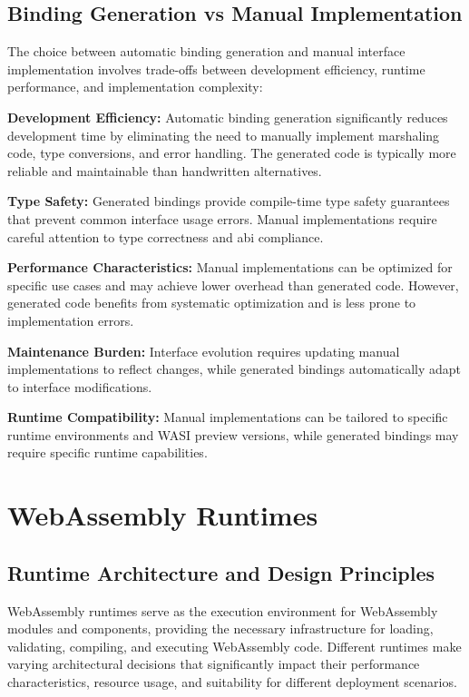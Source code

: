 \subsection{Binding Generation vs Manual Implementation}
\label{subsec:binding-comparison}

The choice between automatic binding generation and manual interface implementation involves trade-offs between development efficiency, runtime performance, and implementation complexity:

\textbf{Development Efficiency:} Automatic binding generation significantly reduces development time by eliminating the need to manually implement marshaling code, type conversions, and error handling. The generated code is typically more reliable and maintainable than handwritten alternatives.

\textbf{Type Safety:} Generated bindings provide compile-time type safety guarantees that prevent common interface usage errors. Manual implementations require careful attention to type correctness and \acrshort{abi} compliance.

\textbf{Performance Characteristics:} Manual implementations can be optimized for specific use cases and may achieve lower overhead than generated code. However, generated code benefits from systematic optimization and is less prone to implementation errors.

\textbf{Maintenance Burden:} Interface evolution requires updating manual implementations to reflect changes, while generated bindings automatically adapt to interface modifications.

\textbf{Runtime Compatibility:} Manual implementations can be tailored to specific runtime environments and WASI preview versions, while generated bindings may require specific runtime capabilities.

\section{WebAssembly Runtimes}
\label{sec:wasm-runtimes}

\subsection{Runtime Architecture and Design Principles}
\label{subsec:runtime-architecture}

WebAssembly runtimes serve as the execution environment for WebAssembly modules and components, providing the necessary infrastructure for loading, validating, compiling, and executing WebAssembly code. Different runtimes make varying architectural decisions that significantly impact their performance characteristics, resource usage, and suitability for different deployment scenarios.

